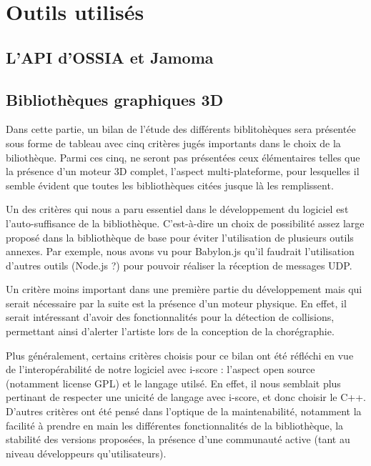 \section{Outils utilisés}

\subsection{L'API d'OSSIA et Jamoma}

\subsection{Bibliothèques graphiques 3D}

Dans cette partie, un bilan de l'étude des différents biblitohèques sera présentée sous forme de tableau avec cinq critères jugés importants dans le choix de la biliothèque. Parmi ces cinq, ne seront pas présentées ceux élémentaires telles que la présence d'un moteur 3D complet, l'aspect multi-plateforme, pour lesquelles il semble évident que toutes les bibliothèques citées jusque là les remplissent.

Un des critères qui nous a paru essentiel dans le développement du logiciel est l'auto-suffisance de la bibliothèque. C'est-à-dire un choix de possibilité assez large proposé dans la bibliothèque de base pour éviter l'utilisation de plusieurs outils annexes. Par exemple, nous avons vu pour Babylon.js qu'il faudrait l'utilisation d'autres outils (Node.js ?) pour pouvoir réaliser la réception de messages UDP. 

Un critère moins important dans une première partie du développement mais qui serait nécessaire par la suite est la présence d'un moteur physique. En effet, il serait intéressant d'avoir des fonctionnalités pour la détection de collisions, permettant ainsi d'alerter l'artiste lors de la conception de la chorégraphie.

Plus généralement, certains critères choisis pour ce bilan ont été réfléchi en vue de l'interopérabilité de notre logiciel avec i-score : l'aspect open source (notamment license GPL) et le langage utilsé. En effet, il nous semblait plus pertinant de respecter une unicité de langage avec i-score, et donc choisir le C++. 
D'autres critères ont été pensé dans l'optique de la maintenabilité, notamment la facilité à prendre en main les différentes fonctionnalités de la bibliothèque, la stabilité des versions proposées, la présence d'une communauté active (tant au niveau développeurs qu'utilisateurs).



